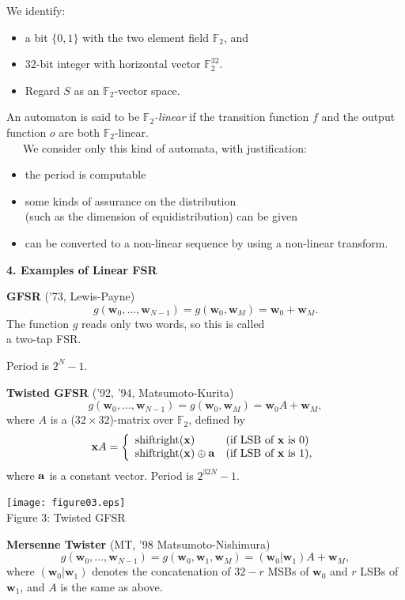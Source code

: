 \documentclass[a4j,12pt,landscape]{jarticle}
\def\F2{{\mathbb F}_2}
\def\bx{{{\mathbf x}}}
\def\bw{{{\mathbf w}}}
\begin{document}
We identify: 
\begin{itemize}
\item 
a bit $\{0,1\}$ with the two element field $\F2$, and
\item 
32-bit integer with horizontal vector $\F2^{32}$.
\item 
Regard $S$ as an $\F2$-vector space.
\end{itemize}
An automaton is said to be {\em $\F2$-linear} if 
the transition function $f$ and 
the output function $o$ are both $\F2$-linear. \\
~~~We consider only this kind of automata, with 
justification:
\begin{itemize}
\item the period is computable
\item some kinds of assurance on the distribution \\
(such as the dimension of equidistribution) can be given
\item can be converted to a non-linear sequence 
by using a non-linear transform. 
\end{itemize}

\newpage
\noindent
{\bf 4. Examples of Linear FSR}

{\bf GFSR} ('73, Lewis-Payne)
$$
g(\bw_0,\ldots,\bw_{N-1}) = g(\bw_0, \bw_M) = \bw_0 + \bw_M.
$$
The function $g$ reads only two words, so this is called \\
a two-tap FSR.

Period is $2^N-1$.

\newpage
{\bf Twisted GFSR} ('92, '94, Matsumoto-Kurita)
$$
g(\bw_0,\ldots,\bw_{N-1}) = g(\bw_0, \bw_M) = \bw_0A + \bw_M,
$$
where $A$ is a ($32\times 32$)-matrix over $\F2$, defined by
$$
\bx A = 
\left\{\begin{array}{ll}
  \mbox{shiftright}({\bf x}) & (\mbox{if LSB of $\bx$ is 0}) \\
  \mbox{shiftright}({\bf x})\oplus{\bf a} & 
  (\mbox{if LSB of $\bx$ is 1}),
\end{array}\right.
$$
where ${\bf a}$ is a constant vector.
Period is $2^{32N}-1$. 
\begin{center}
\texttt{[image: figure03.eps]}
\\
Figure 3: Twisted GFSR
\end{center}
\newpage
{\bf Mersenne Twister} (MT, '98 Matsumoto-Nishimura)
$$
g(\bw_0,\ldots,\bw_{N-1}) = g(\bw_0, \bw_1, \bw_M) = (\bw_0|\bw_1)A + \bw_M,
$$
where $(\bw_0|\bw_1)$ denotes
the concatenation of $32-r$ MSBs of $\bw_0$ and $r$ LSBs of $\bw_1$,
and $A$ is the same as above.
\end{document}
